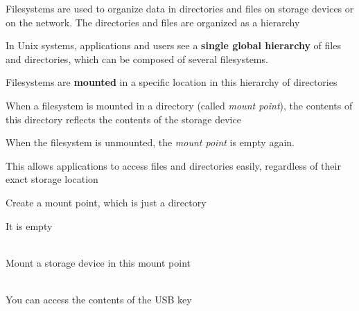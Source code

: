 
  \startitemize
  \item Filesystems are used to organize data in directories and files
    on storage devices or on the network. The directories and files
    are organized as a hierarchy
  \item In Unix systems, applications and users see a {\bf single
      global hierarchy} of files and directories, which can be
    composed of several filesystems.
  \item Filesystems are {\bf mounted} in a specific location in this
    hierarchy of directories
    \startitemize
    \item When a filesystem is mounted in a directory (called {\em
        mount point}), the contents of this directory reflects the
      contents of the storage device
    \item When the filesystem is unmounted, the {\em mount point} is
      empty again.
    \stopitemize
  \item This allows applications to access files and directories easily,
    regardless of their exact storage location
  \stopitemize

  \startitemize
  \item Create a mount point, which is just a directory\\
  \item It is empty\\
    \\
    \type{$}
  \item Mount a storage device in this mount point\\
    \\
    \type{$}
  \item You can access the contents of the USB key\\
    \\
    \\
    \type{$}
  \stopitemize

